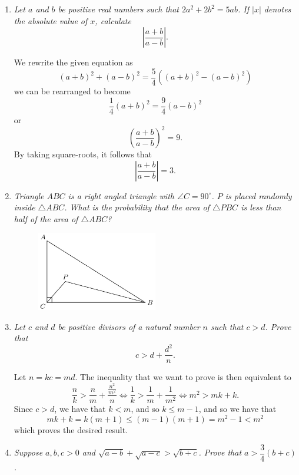 \documentclass{article}
\begin{document}
\begin{enumerate}[1.]
\vspace{6pt}
\item %
{\itshape Let $a$ and $b$ be positive real numbers such that $2a^2 +2b^2 = 5ab$.
If $|x|$ denotes the absolute value of $x$, calculate
\[ \left|\frac{a+b}{a-b}\right|. \]}

We rewrite the given equation as
\[
	(a + b)^2 + (a - b)^2 = \frac{5}{4} \left( (a + b)^2 - (a - b)^2 \right)	
\]
we can be rearranged to become
\[
	\frac{1}{4} (a + b)^2 = \frac{9}{4} (a - b)^2	
\]
or
\[
	\left( \frac{a + b}{a - b} \right)^2 = 9.
\]
By taking square-roots, it follows that
\[
	\left| \frac{a + b}{a - b} \right| = 3.	
\]



\vspace{6pt}
\item %
{\itshape Triangle $ABC$ is a right angled triangle with $\angle C = 90^{\circ}$. $P$ is placed randomly inside $\triangle ABC$. What is the probability that the area of $\triangle PBC$ is less than half of the area of $\triangle ABC$?
\begin{figure}[h]
\centering
\includegraphics[width=0.5\textwidth]{../fig.jpg}
\end{figure}}


\vspace{6pt}
\item %
{\itshape Let $c$ and $d$ be positive divisors of a natural number $n$ such that $c > d$. Prove that $$c > d + \frac{d^2}{n}.$$}

Let $n = kc = md$. The inequality that we want to prove is then equivalent to
\[
	\frac{n}{k} > \frac{n}{m} + \frac{\frac{n^2}{m^2}}{n} \iff \frac{1}{k} > \frac{1}{m} + \frac{1}{m^2} \iff m^2 > mk + k.
\]
Since $c > d$, we have that $k < m$, and so $k \leq m - 1$, and so we have that
\[
	mk + k = k(m + 1) \leq (m - 1)(m + 1) = m^2 - 1 < m^2
\]
which proves the desired result.


\vspace{6pt}
\item %
{\itshape Suppose $a,b,c > 0$ and $\sqrt{a-b} +\sqrt{a-c} > \sqrt{b+c}$. Prove that $a > \dfrac{3}{4} (b+c)$.}


\end{enumerate}
\end{document}

